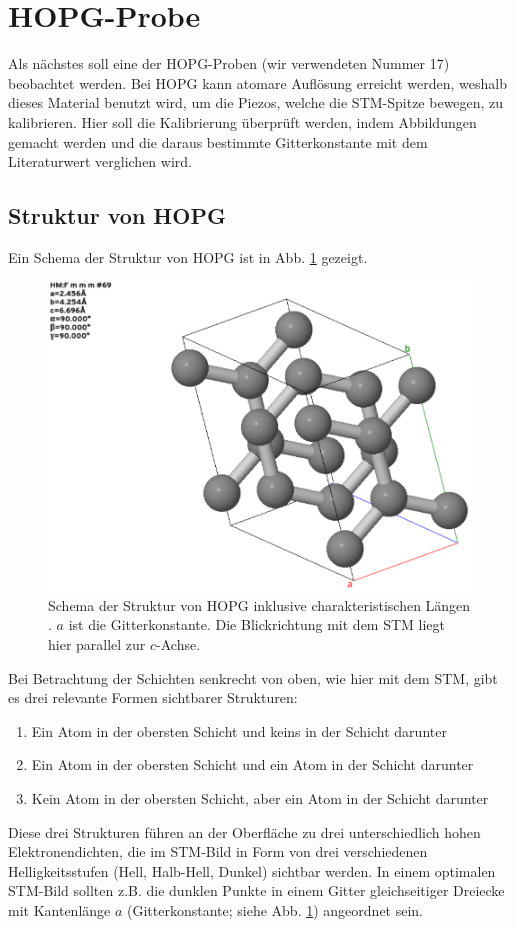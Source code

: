 \documentclass{article}
\begin{document}
\newpage

\section{HOPG-Probe}
Als nächstes soll eine der HOPG-Proben (wir verwendeten Nummer 17) beobachtet werden.
Bei HOPG kann atomare Auflösung erreicht werden, weshalb dieses Material benutzt wird, um die Piezos, welche die STM-Spitze
bewegen, zu kalibrieren. Hier soll die Kalibrierung überprüft werden, indem Abbildungen gemacht werden und die daraus
bestimmte Gitterkonstante mit dem Literaturwert verglichen wird.

\subsection{Struktur von HOPG}
Ein Schema der Struktur von HOPG ist in Abb. \ref{fig:hopg-structure} gezeigt.
\begin{figure}[h]
    \centering
    \includegraphics[width=0.5\linewidth]{hopg-structure}
    \caption{
        Schema der Struktur von HOPG inklusive charakteristischen Längen \cite{graphite}. $a$ ist die Gitterkonstante.
        Die Blickrichtung mit dem STM liegt hier parallel zur $c$-Achse.
    }
    \label{fig:hopg-structure}
\end{figure}
Bei Betrachtung der Schichten senkrecht von oben, wie hier mit dem STM, gibt es drei relevante Formen sichtbarer Strukturen:
\begin{enumerate}
  \item Ein Atom in der obersten Schicht und keins in der Schicht darunter
  \item Ein Atom in der obersten Schicht und ein Atom in der Schicht darunter
  \item Kein Atom in der obersten Schicht, aber ein Atom in der Schicht darunter
\end{enumerate}
Diese drei Strukturen führen an der Oberfläche zu drei unterschiedlich hohen Elektronendichten,
die im STM-Bild in Form von drei verschiedenen Helligkeitsstufen (Hell, Halb-Hell, Dunkel) sichtbar werden.
In einem optimalen STM-Bild sollten z.B. die dunklen Punkte in
einem Gitter gleichseitiger Dreiecke mit Kantenlänge $a$ (Gitterkonstante; siehe Abb. \ref{fig:hopg-structure}) angeordnet sein.
\end{document}

